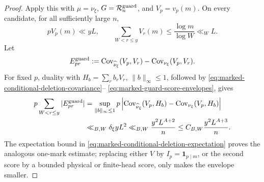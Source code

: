 \documentclass[11pt]{article}
\numberwithin{equation}{section}
\theoremstyle{definition}
\theoremstyle{remark}
\newcommand{\1}{\mathbf 1}
\begin{document}
\begin{proof}
Apply this with \(\mu=\nu_\xi\), \(G=\mathcal R_n^{\rm guard}\), and
\(V_p=v_p(m)\).  On every candidate, for all sufficiently large \(n\),
\begin{equation}
 pV_p(m)\ll yL,
 \qquad
 \sum_{W<r\leq y}V_r(m)\leq\frac{\log m}{\log W}\ll_W L.
 \label{eq:marked-guard-score-envelopes}
\end{equation}
Let
\[
 E^{\rm guard}_{pr}:=
 \operatorname{Cov}_{\widehat\nu_\xi}(V_p,V_r)
 -\operatorname{Cov}_{\nu_\xi}(V_p,V_r).
\]
For fixed \(p\), duality with
\(H_b=\sum_r b_rV_r\), \(\|b\|_\infty\leq1\), followed by
\eqref{eq:marked-conditional-deletion-covariance}--
\eqref{eq:marked-guard-score-envelopes}, gives
\begin{align}
 p\sum_{W<r\leq y}|E^{\rm guard}_{pr}|
 &=\sup_{\|b\|_\infty\leq1}
      p\left|\operatorname{Cov}_{\widehat\nu_\xi}(V_p,H_b)
             -\operatorname{Cov}_{\nu_\xi}(V_p,H_b)\right|\notag\\
 &\ll_{B,W}\delta_\xi yL^2
 \ll_{B,W}\frac{y^2L^{A+2}}n
 \leq C_{B,W}\frac{y^2L^{A+3}}n.
 \label{eq:marked-guard-explicit-prime-row}
\end{align}
The expectation bound in
\eqref{eq:marked-conditional-deletion-expectation} proves the analogous
one-mark estimate; replacing either \(V\) by \(I_p=\1_{p\mid m}\), or
the second score by a bounded physical or finite-head score, only makes
the envelope smaller.


\end{proof}
\end{document}
